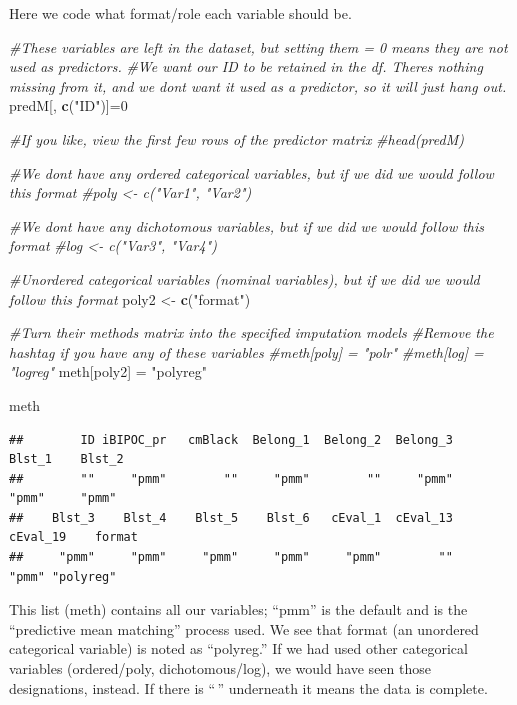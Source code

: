 \documentclass[
  11pt,
]{book}
\newenvironment{Shaded}{\begin{snugshade}}{\end{snugshade}}
\newcommand{\CommentTok}[1]{\textcolor[rgb]{0.37,0.37,0.37}{\textit{#1}}}
\newcommand{\DecValTok}[1]{\textcolor[rgb]{0.06,0.06,0.06}{#1}}
\newcommand{\FunctionTok}[1]{\textcolor[rgb]{0.27,0.27,0.27}{\textbf{#1}}}
\newcommand{\NormalTok}[1]{#1}
\newcommand{\OtherTok}[1]{\textcolor[rgb]{0.37,0.37,0.37}{#1}}
\newcommand{\StringTok}[1]{\textcolor[rgb]{0.5,0.5,0.5}{#1}}
\begin{document}
Here we code what format/role each variable should be.

\begin{Shaded}
\begin{Highlighting}[]
\CommentTok{\#These variables are left in the dataset, but setting them = 0 means they are not used as predictors.  }
\CommentTok{\#We want our ID to be retained in the df.  There\textquotesingle{}s nothing missing from it, and we don\textquotesingle{}t want it used as a predictor, so it will just hang out.}
\NormalTok{predM[, }\FunctionTok{c}\NormalTok{(}\StringTok{"ID"}\NormalTok{)]}\OtherTok{=}\DecValTok{0}

\CommentTok{\#If you like, view the first few rows of the predictor matrix}
\CommentTok{\#head(predM)}

\CommentTok{\#We don\textquotesingle{}t have any ordered categorical variables, but if we did we would follow this format}
\CommentTok{\#poly \textless{}{-} c("Var1", "Var2")}

\CommentTok{\#We don\textquotesingle{}t have any dichotomous variables, but if we did we would follow this format}
\CommentTok{\#log \textless{}{-} c("Var3", "Var4")}

\CommentTok{\#Unordered categorical variables (nominal variables), but if we did we would follow this format}
\NormalTok{poly2 }\OtherTok{\textless{}{-}} \FunctionTok{c}\NormalTok{(}\StringTok{"format"}\NormalTok{)}

\CommentTok{\#Turn their methods matrix into the specified imputation models}
\CommentTok{\#Remove the hashtag if you have any of these variables}
\CommentTok{\#meth[poly] = "polr" }
\CommentTok{\#meth[log] = "logreg"}
\NormalTok{meth[poly2] }\OtherTok{=} \StringTok{"polyreg"}

\NormalTok{meth}
\end{Highlighting}
\end{Shaded}

\begin{verbatim}
##        ID iBIPOC_pr   cmBlack  Belong_1  Belong_2  Belong_3    Blst_1    Blst_2 
##        ""     "pmm"        ""     "pmm"        ""     "pmm"     "pmm"     "pmm" 
##    Blst_3    Blst_4    Blst_5    Blst_6   cEval_1  cEval_13  cEval_19    format 
##     "pmm"     "pmm"     "pmm"     "pmm"     "pmm"        ""     "pmm" "polyreg"
\end{verbatim}

This list (meth) contains all our variables; ``pmm'' is the default and is the ``predictive mean matching'' process used. We see that format (an unordered categorical variable) is noted as ``polyreg.'' If we had used other categorical variables (ordered/poly, dichotomous/log), we would have seen those designations, instead. If there is ``\,'' underneath it means the data is complete.
\end{document}
